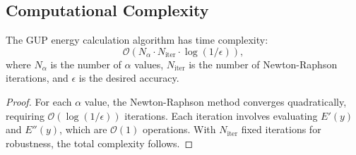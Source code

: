 \subsection{Computational Complexity}

\begin{theorem}
The GUP energy calculation algorithm has time complexity:
\[
\mathcal{O}(N_{\alpha} \cdot N_{\text{iter}} \cdot \log(1/\epsilon)),
\]
where $N_{\alpha}$ is the number of $\alpha$ values, $N_{\text{iter}}$ is the number of Newton-Raphson iterations, and $\epsilon$ is the desired accuracy.
\end{theorem}

\begin{proof}
For each $\alpha$ value, the Newton-Raphson method converges quadratically, requiring $\mathcal{O}(\log(1/\epsilon))$ iterations. Each iteration involves evaluating $E'(y)$ and $E''(y)$, which are $\mathcal{O}(1)$ operations. With $N_{\text{iter}}$ fixed iterations for robustness, the total complexity follows.
\end{proof}
